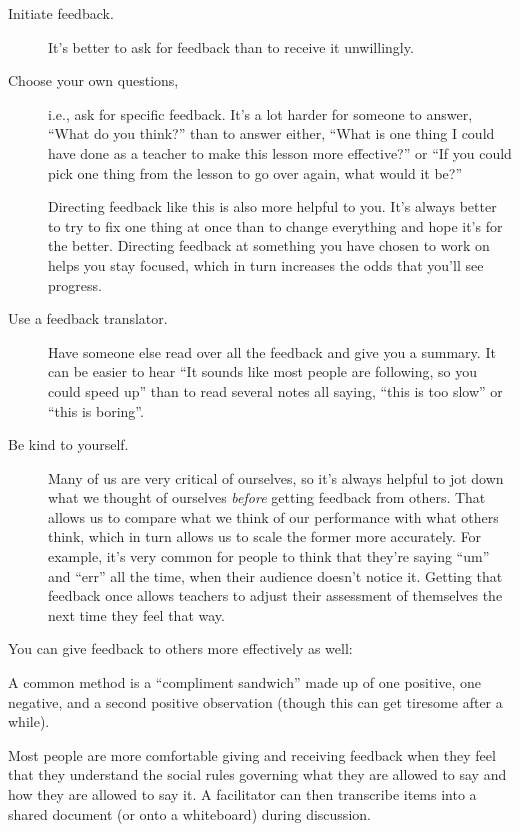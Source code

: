 \begin{description}
\item[Initiate feedback.]
It's better to ask for feedback than to receive it unwillingly.
\item[Choose your own questions,]
i.e., ask for specific feedback. It's a lot harder for someone to
answer, ``What do you think?'' than to answer either, ``What is one
thing I could have done as a teacher to make this lesson more
effective?'' or ``If you could pick one thing from the lesson to go
over again, what would it be?''

Directing feedback like this is also more helpful to you. It's
always better to try to fix one thing at once than to change
everything and hope it's for the better. Directing feedback at
something you have chosen to work on helps you stay focused, which
in turn increases the odds that you'll see progress.
\item[Use a feedback translator.]
Have someone else read over all the feedback and give you a summary.
It can be easier to hear ``It sounds like most people are following,
so you could speed up'' than to read several notes all saying, ``this
is too slow'' or ``this is boring''.
\item[Be kind to yourself.]
Many of us are very critical of ourselves, so it's always helpful to
jot down what we thought of ourselves \emph{before} getting feedback from
others. That allows us to compare what we think of our performance
with what others think, which in turn allows us to scale the former
more accurately. For example, it's very common for people to think
that they're saying ``um'' and ``err'' all the time, when their audience
doesn't notice it. Getting that feedback once allows teachers to
adjust their assessment of themselves the next time they feel that
way.
\end{description}

You can give feedback to others more effectively as well:

\begin{description}
\tightlist
\item[Balance positive and negative feedback.]
A common method is a ``compliment sandwich'' made up of one positive,
one negative, and a second positive observation (though this can get
tiresome after a while).
\item[Organize your feedback using a rubric.]
Most people are more comfortable giving and receiving feedback when
they feel that they understand the social rules governing what they
are allowed to say and how they are allowed to say it. A facilitator
can then transcribe items into a shared document (or onto a
whiteboard) during discussion.
\end{description}

